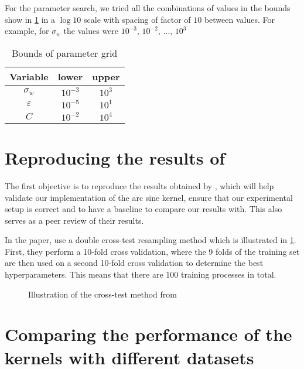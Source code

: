 For the parameter search, we tried all the combinations of values
in the bounds show in \cref{tab:paramgrid} in a $\log 10$ scale with
spacing of factor of $10$ between values. For example, for $\sigma_w$ the values
were $10^{-3},\,10^{-2},\,\dots,\,10^{3}$

\begin{table}[H]
    \caption{Bounds of parameter grid}%
    \label{tab:paramgrid}
    \begin{tabular}{ccc}
        \toprule
        Variable & lower & upper \\
        \midrule
        $\sigma_w$ & $10^{-3}$ & $10^3$ \\
        $\varepsilon$ & $10^{-5}$ & $10^1$ \\
        $C$ & $10^{-2}$ & $10^4$ \\
        \bottomrule
    \end{tabular}
\end{table}

\section{Reproducing the results of \texorpdfstring{\citeauthor{frenayParameterinsensitiveKernelExtreme2011}}{Frénay and Verleysen}}
\label{sec:reproducing-frenay}

The first objective is to reproduce the results obtained by \textcite{frenayParameterinsensitiveKernelExtreme2011},
which will help validate our implementation of the arc sine kernel, ensure that our experimental setup is
correct and to have a baseline to compare our results with. This also serves as a peer review
of their results.

In the paper, \citeauthor{frenayParameterinsensitiveKernelExtreme2011} use a double cross-test resampling
method which is illustrated in \cref{fig:frenay-cross-test}. First, they perform a 10-fold cross validation,
where the 9 folds of the training set are then used on a second 10-fold cross validation to determine the
best hyperparameters. This means that there are 100 training processes in total.

\begin{figure}[H]
    
	\caption{Illustration of the cross-test method from \cite{frenayParameterinsensitiveKernelExtreme2011}}
	\label{fig:frenay-cross-test}
\end{figure}

\section{Comparing the performance of the kernels with different datasets}%

